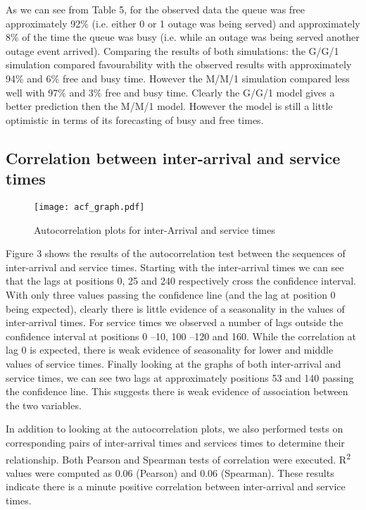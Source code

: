 \documentclass[5p]{elsarticle}
\begin{document}
As we can see from Table 5, for the observed data the queue was free approximately 92\% (i.e. either 0 or 1 outage was being served) and approximately 8\% of the time the queue was busy (i.e. while an outage was being served another outage event arrived). Comparing the results of both simulations: the G/G/1 simulation compared favourability with the observed results with approximately 94\% and 6\% free and busy time. However the M/M/1 simulation compared less well with 97\% and 3\% free and busy time. Clearly the G/G/1 model gives a better prediction then the M/M/1 model. However the model is still a little optimistic in terms of its forecasting of busy and free times.

\subsection{Correlation between inter-arrival and service times}

\begin{figure*}[]
\begin{center}
\texttt{[image: acf\_graph.pdf]} 
\caption{Autocorrelation plots for inter-Arrival and service times}
\end{center}
\label{fig:acfgraphs}
\end{figure*}

Figure 3 shows the results of the autocorrelation test between the sequences of inter-arrival and service times. Starting with the inter-arrival times we can see that the lags at positions 0, 25 and 240 respectively cross the confidence interval. With only three values passing the confidence line (and the lag at position 0 being expected), clearly there is little evidence of a seasonality in the values of inter-arrival times. For service times we observed a number of lags outside the confidence interval at positions 0 --10, 100 --120 and 160. While the correlation at lag 0 is expected, there is weak evidence of seasonality for lower and middle values of service times. Finally looking at the graphs of both inter-arrival and service times, we can see two lags at approximately positions 53 and 140 passing the confidence line. This suggests there is weak evidence of association between the two variables.

In addition to looking at the autocorrelation plots, we also performed tests on corresponding pairs of inter-arrival times and services times to determine their relationship. Both Pearson and Spearman tests of correlation were executed. R\textsuperscript{2} values were computed as 0.06 (Pearson) and 0.06 (Spearman). These results indicate there is a minute positive correlation between inter-arrival and service times.
\end{document}
